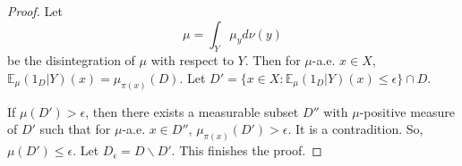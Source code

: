 \documentclass[10pt,a4paper]{amsart}
\def \E {\mathbb E}
\def \ep {\epsilon}
\begin{document}
\begin{proof}
	Let $$\mu=\int_{Y}\mu_{y}d\nu(y)$$ be the disintegration of $\mu$ with respect to $Y$. Then for $\mu$-a.e. $x\in X$, $\E_{\mu}(1_D|Y)(x)=\mu_{\pi(x)}(D)$. Let $D'=\{x\in X:\E_{\mu}(1_D|Y)(x)\le \ep\}\cap D$.

	If $\mu(D')>\ep$, then there exists a measurable subset $D''$ with $\mu$-positive measure of $D'$ such that for $\mu$-a.e. $x\in D''$, $\mu_{\pi(x)}(D')> \ep$. It is a contradition. So, $\mu(D')\le\ep$. Let $D_{\ep}=D\backslash {D'}$. This finishes the proof.
\end{proof}
\end{document}
